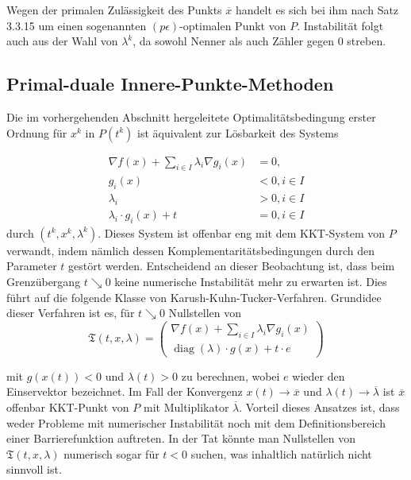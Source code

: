 \documentclass[11pt]{scrreprt}
\newcounter{thm}
\theoremstyle{thmstyle}
\numberwithin{thm}{section}
\begin{document}
Wegen der primalen Zulässigkeit des Punkts $\overline{x}$ handelt es sich bei ihm nach Satz 3.3.15 um einen sogenannten $(p \epsilon)$-optimalen Punkt von $P$. Instabilität folgt auch aus der Wahl von $\lambda^k$, da sowohl Nenner als auch Zähler gegen 0 streben.

\subsection*{Primal-duale Innere-Punkte-Methoden}
	
Die im vorhergehenden Abschnitt hergeleitete Optimalitätsbedingung erster Ordnung für $x^k$ in $P(t^k)$ ist äquivalent zur Lösbarkeit des Systems

\begin{align*}
	\nabla f(x) + \sum_{i \in I} \lambda_i \nabla g_i(x) & = 0, \\
	g_i(x) & < 0, i \in I \\
	\lambda_i & > 0, i \in I \\
	\lambda_i \cdot g_i(x) + t & = 0, i \in I
\end{align*}	
durch $(t^k, x^k, \lambda^k)$. Dieses System ist offenbar eng mit dem KKT-System von $P$ verwandt, indem nämlich dessen Komplementaritätsbedingungen durch den Parameter $t$ gestört werden. Entscheidend an dieser Beobachtung ist, dass beim Grenzübergang $t \searrow 0$ keine numerische Instabilität mehr zu erwarten ist. Dies führt auf die folgende Klasse von Karush-Kuhn-Tucker-Verfahren. Grundidee dieser Verfahren ist es, für $t \searrow 0$ Nullstellen von
	$$ \mathfrak{T}(t, x, \lambda) = \begin{pmatrix}
		\nabla f(x) + \sum_{i \in I} \lambda_i \nabla g_i(x) \\
		\operatorname{diag}(\lambda) \cdot g(x) + t \cdot e
	\end{pmatrix} $$
	
mit $g(x(t)) < 0$ und $\lambda(t) > 0$ zu berechnen, wobei $e$ wieder den Einservektor bezeichnet. Im Fall der Konvergenz $x(t) \rightarrow \overline{x}$ und $\lambda(t) \rightarrow \overline{\lambda}$ ist $\overline{x}$ offenbar KKT-Punkt von $P$ mit Multiplikator $\overline{\lambda}$. Vorteil dieses Ansatzes ist, dass weder Probleme mit numerischer Instabilität noch mit dem Definitionsbereich einer Barrierefunktion auftreten. In der Tat könnte man Nullstellen von $\mathfrak{T}(t, x, \lambda)$ numerisch sogar für $t < 0$ suchen, was inhaltlich natürlich nicht sinnvoll ist.

\setcounter{thm}{16}
\end{document}
